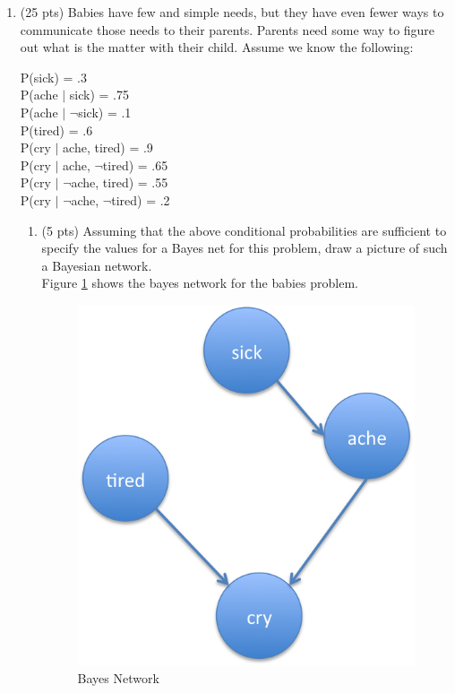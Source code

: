 \documentclass{article}%
\begin{document}
\begin{enumerate}
\item (25 pts) Babies have few and simple needs, but they have even fewer ways to communicate those needs to their parents. Parents need some way to figure out what is the matter with their child. Assume we know the following:

P(sick) = .3 \\
P(ache $|$ sick) = .75\\
P(ache $|$ $\neg$sick) = .1\\
P(tired) = .6\\
P(cry $|$ ache, tired) = .9\\
P(cry $|$ ache, $\neg$tired) = .65\\
P(cry $|$ $\neg$ache, tired) = .55\\
P(cry $|$ $\neg$ache, $\neg$tired) = .2\\

	\begin{enumerate}
		\item (5 pts) Assuming that the above conditional probabilities are sufficient to specify the values for a Bayes net for this problem, draw a picture of such a Bayesian network.\\
		
		Figure \ref{fig:bn} shows the bayes network for the babies problem.\\
	
\begin{figure}[!iht]
\begin{center}
  \includegraphics[scale=0.5]{bayesNetwork.png}
  \caption{Bayes Network}
  \label{fig:bn}
  \vspace*{-4ex}
\end{center}
\end{figure}


\end{enumerate}
\end{enumerate}
\end{document}
